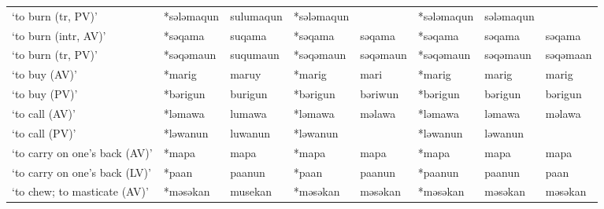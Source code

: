 \begin{landscape}
\begin{longtable}[c]{@{}p{3cm}<{\raggedright}p{2.75cm}<{\raggedright}p{2.75cm}<{\raggedright}p{2.75cm}<{\raggedright}p{2.75cm}<{\raggedright}p{2.75cm}<{\raggedright}p{2.75cm}<{\raggedright}p{2.75cm}<{\raggedright}@{}}
`to burn (tr, PV)'                                   & *sələmaqun         & sulumaqun                      & *sələmaqun         &                            & *sələmaqun       & sələmaqun                &                                   \\
`to burn (intr, AV)'                                 & *səqama            & suqama                         & *səqama            & səqama                     & *səqama          & səqama                   & səqama                            \\
`to burn (tr, PV)'                                   & *səqəmaun          & suqumaun                       & *səqəmaun          & səqəmaun                   & *səqəmaun        & səqəmaun                 & səqəmaan                          \\
`to buy (AV)'                                        & *marig             & maruy                          & *marig             & mari                       & *marig           & marig                    & marig                             \\
`to buy (PV)'                                        & *bərigun           & burigun                        & *bərigun           & bəriwun                    & *bərigun         & bərigun                  & bərigun                           \\
`to call (AV)'                                       & *ləmawa            & lumawa                         & *ləmawa            & məlawa                     & *ləmawa          & ləmawa                   & məlawa                            \\
`to call (PV)'                                       & *ləwanun           & luwanun                        & *ləwanun           &                            & *ləwanun         & ləwanun                  &                                   \\
`to carry on one's back (AV)'                        & *mapa              & mapa                           & *mapa              & mapa                       & *mapa            & mapa                     & mapa                              \\
`to carry on one's back (LV)'                        & *paan              & paanun                         & *paan              & paanun                     & *paanun          & paanun                   & paan                              \\
`to chew; to masticate (AV)'                         & *məsəkan           & musekan                        & *məsəkan           & məsəkan                    & *məsəkan         & məsəkan                  & məsəkan                           \\

\end{longtable}
\end{landscape}

